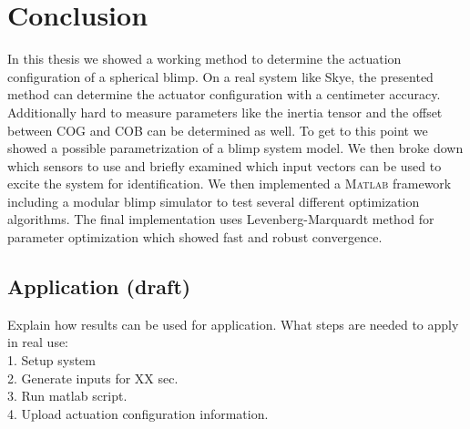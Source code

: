 \chapter{Conclusion}
\label{chap:conclusion}

In this thesis we showed a working method to determine the actuation configuration of a spherical blimp.
On a real system like Skye, the presented method can determine the actuator configuration with a centimeter accuracy.
Additionally hard to measure parameters like the inertia tensor and the offset between COG and COB can be determined as well.
To get to this point we showed a possible parametrization of a blimp system model.
We then broke down which sensors to use and briefly examined which input vectors can be used to excite the system for identification.
We then implemented a \textsc{Matlab} framework including a modular blimp simulator to test several different optimization algorithms.
The final implementation uses Levenberg-Marquardt method for parameter optimization which showed fast and robust convergence.\\



\section{Application (draft)}
Explain how results can be used for application.
What steps are needed to apply in real use: \\
1. Setup system \\
2. Generate inputs for XX sec. \\
3. Run matlab script. \\
4. Upload actuation configuration information.

